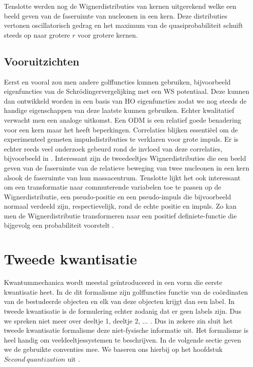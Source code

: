 \documentclass[11pt,twoside]{book}
\begin{document}
Tenslotte werden nog de Wignerdistributies van kernen uitgerekend welke een beeld geven van de faseruimte van nucleonen in een kern.
Deze distributies vertonen oscillatorisch gedrag en het maximum van de quasiprobabiliteit schuift steeds op naar grotere $r$ voor grotere kernen.


\section{Vooruitzichten}

Eerst en vooral zou men andere golffuncties kunnen gebruiken, bijvoorbeeld eigenfuncties van de Schr\"{o}dingervergelijking met een WS potentiaal. Deze kunnen dan ontwikkeld worden in een basis van HO eigenfuncties zodat we nog steeds de handige eigenschappen van deze laatste kunnen gebruiken. Echter kwalitatief verwacht men een analoge uitkomst.
Een ODM is een relatief goede benadering voor een kern maar het heeft beperkingen. Correlaties blijken essenti\"{e}el om de experimenteel gemeten impulsdistributies te verklaren voor grote impuls. Er is echter reeds veel onderzoek gebeurd rond de invloed van deze correlaties, bijvoorbeeld in \cite{maarten,ryckebusch2015stylized,wiringa2014nucleon}.
Interessant zijn de tweedeeltjes Wignerdistributies die een beeld geven van de faseruimte van de relatieve beweging van twee nucleonen in een kern alsook de faseruimte van hun massacentrum.
Tenslotte lijkt het ook interessant om een transformatie naar commuterende variabelen toe te passen op de Wignerdistributie, een pseudo-positie en een pseudo-impuls die bijvoorbeeld normaal verdeeld zijn, respectievelijk, rond de echte positie en impuls. Zo kan men de Wignerdistributie transformeren naar een positief definiete-functie die bijgevolg een probabiliteit voorstelt \cite{lee1995theory}. 


\newpage
\appendix
{}

\chapter{ Tweede kwantisatie} 
Kwantummechanica wordt meestal ge\"{i}ntroduceerd in een vorm die eerste kwantisatie heet. In de dit formalisme zijn golffuncties functie van de co\"{o}rdinaten van de bestudeerde objecten en elk van deze objecten krijgt dan een label. In tweede kwantisatie  is de formulering echter zodanig  dat er geen labels zijn. Dus we spreken niet meer over deeltje 1, deeltje 2, ... . Dus in zekere zin sluit het tweede kwantisatie formalisme deze niet-fysische informatie uit. Het formalisme is heel handig om veeldeeltjessystemen te beschrijven. In de volgende sectie geven we de gebruikte conventies mee. We baseren ons hierbij op het hoofdstuk $Second\ quantization$ uit \cite{dimitri}.
\end{document}
